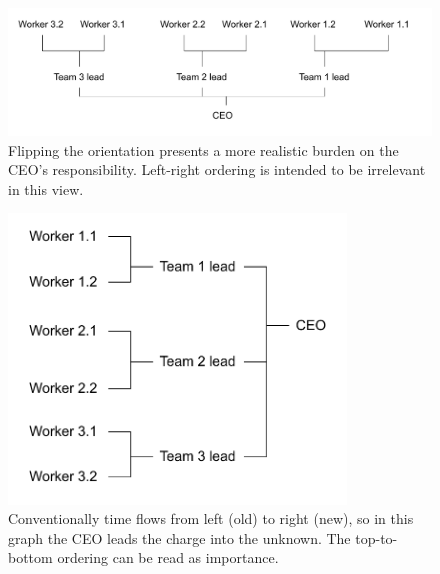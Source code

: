\begin{figure}
\includegraphics[width=1\textwidth]{images/org-chart-orientation-ceo-at-bottom.pdf}
\caption{Flipping the orientation presents a more realistic burden on the CEO's responsibility. Left-right ordering is intended to be irrelevant in this view.}
\label{org_chart_orientation_ceo-at-bottom}
\end{figure}

\begin{figure}
\includegraphics[width=0.8\textwidth]{images/org-chart-orientation-ceo-leads.pdf}
\caption{Conventionally time flows from left (old) to right (new), so in this graph the CEO leads the charge into the unknown. The top-to-bottom ordering can be read as importance. }
\label{org_chart_orientation_ceo-leads}
\end{figure}

